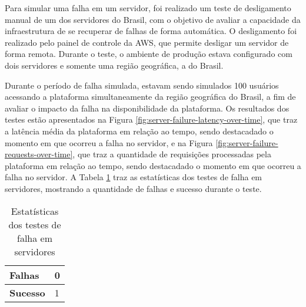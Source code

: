 Para simular uma falha em um servidor, foi realizado um teste de desligamento manual de um dos servidores do Brasil, com o objetivo de avaliar a capacidade da infraestrutura de se recuperar de falhas de forma automática. O desligamento foi realizado pelo painel de controle da AWS, que permite desligar um servidor de forma remota. Durante o teste, o ambiente de produção estava configurado com dois servidores e somente uma região geográfica, a do Brasil.

Durante o período de falha simulada, estavam sendo simulados 100 usuários acessando a plataforma simultaneamente da região geográfica do Brasil, a fim de avaliar o impacto da falha na disponibilidade da plataforma. Os resultados dos testes estão apresentados na Figura \ref{fig:server-failure-latency-over-time}, que traz a latência média da plataforma em relação ao tempo, sendo destacadado o momento em que ocorreu a falha no servidor, e na Figura \ref{fig:server-failure-requests-over-time}, que traz a quantidade de requisições processadas pela plataforma em relação ao tempo, sendo destacadado o momento em que ocorreu a falha no servidor. A Tabela \ref{tab:server-failure-stats} traz as estatísticas dos testes de falha em servidores, mostrando a quantidade de falhas e sucesso durante o teste.



\begin{table}[H]
    \centering
    \caption{Estatísticas dos testes de falha em servidores}
    \label{tab:server-failure-stats}
    \begin{tabular}{|l|l|}
        \hline
        \textbf{Falhas}  & 0 \\ \hline
        \textbf{Sucesso} & 1 \\ \hline
    \end{tabular}
\end{table}

